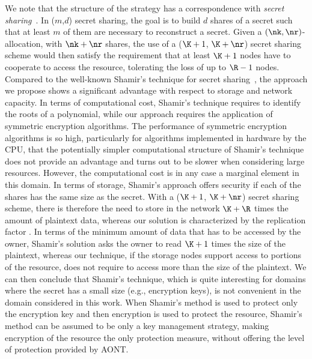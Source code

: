 We note that the structure of the \compact strategy has a
correspondence with {\em secret sharing}~\cite{shamir1979share}. In
($m$,$d$) secret sharing, the goal is to build $d$ shares of a secret
such that at least $m$ of them are necessary to reconstruct a
secret. Given a \compact $(\nk,\nr)$-allocation, with
$\nk+\nr$ shares, the use of a ($\K+1$, $\K+\nr$) secret sharing
scheme would then satisfy the requirement that at least $\K+1$ nodes
have to cooperate to access the resource, tolerating the loss of up to
$\R-1$ nodes. Compared to the well-known Shamir's technique for secret
sharing~\cite{shamir1979share}, the approach we propose shows a
significant advantage with respect to storage and network capacity. In
terms of computational cost, Shamir's technique requires to identify
the roots of a polynomial, while our approach requires the application
of symmetric encryption algorithms. The performance of symmetric
encryption algorithms is so high, particularly for algorithms
implemented in hardware by the CPU, that the potentially simpler
computational structure of Shamir's technique does not provide an
advantage and turns out to be slower when considering large
resources. However, the computational cost is in any case a marginal
element in this domain. In terms of storage, Shamir's approach offers
security if each of the shares has the same size as the secret. With a
($\K+1$, $\K+\nr$) secret sharing scheme, there is therefore the need
to store in the network $\K+\R$ times the amount of plaintext data,
whereas our solution is characterized by the replication factor \R.
In terms of the minimum amount of data that has to be accessed by the
owner, Shamir's solution asks the owner to read $\K+1$ times the size
of the plaintext, whereas our technique, if the storage nodes support
access to portions of the resource, does not require to access more
than the size of the plaintext.  We can then conclude that Shamir's
technique, which is quite interesting for domains where the secret has
a small size (e.g., encryption keys), is not convenient in the domain
considered in this work. When Shamir's method is used to protect only
the encryption key and then encryption is used to protect the
resource, Shamir's method can be assumed to be only a key management
strategy, making encryption of the resource the only protection
measure, without offering the level of protection provided by AONT.

